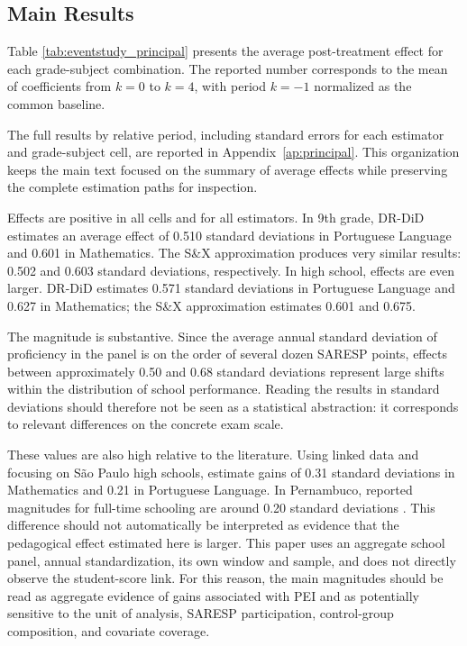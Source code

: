 \subsection{Main Results} \label{sec:resultadosprincipais}

Table \ref{tab:eventstudy_principal} presents the average post-treatment effect for each grade-subject combination. The reported number corresponds to the mean of coefficients from $k=0$ to $k=4$, with period $k=-1$ normalized as the common baseline.



The full results by relative period, including standard errors for each estimator and grade-subject cell, are reported in Appendix~\ref{ap:principal}. This organization keeps the main text focused on the summary of average effects while preserving the complete estimation paths for inspection.

Effects are positive in all cells and for all estimators. In 9th grade, DR-DiD estimates an average effect of 0.510 standard deviations in Portuguese Language and 0.601 in Mathematics. The S\&X approximation produces very similar results: 0.502 and 0.603 standard deviations, respectively. In high school, effects are even larger. DR-DiD estimates 0.571 standard deviations in Portuguese Language and 0.627 in Mathematics; the S\&X approximation estimates 0.601 and 0.675.

The magnitude is substantive. Since the average annual standard deviation of proficiency in the panel is on the order of several dozen SARESP points, effects between approximately 0.50 and 0.68 standard deviations represent large shifts within the distribution of school performance. Reading the results in standard deviations should therefore not be seen as a statistical abstraction: it corresponds to relevant differences on the concrete exam scale.

These values are also high relative to the literature. Using linked data and focusing on São Paulo high schools, \textcite{scorzafave2023} estimate gains of 0.31 standard deviations in Mathematics and 0.21 in Portuguese Language. In Pernambuco, reported magnitudes for full-time schooling are around 0.20 standard deviations \parencite{Pernambuco}. This difference should not automatically be interpreted as evidence that the pedagogical effect estimated here is larger. This paper uses an aggregate school panel, annual standardization, its own window and sample, and does not directly observe the student-score link. For this reason, the main magnitudes should be read as aggregate evidence of gains associated with PEI and as potentially sensitive to the unit of analysis, SARESP participation, control-group composition, and covariate coverage.

